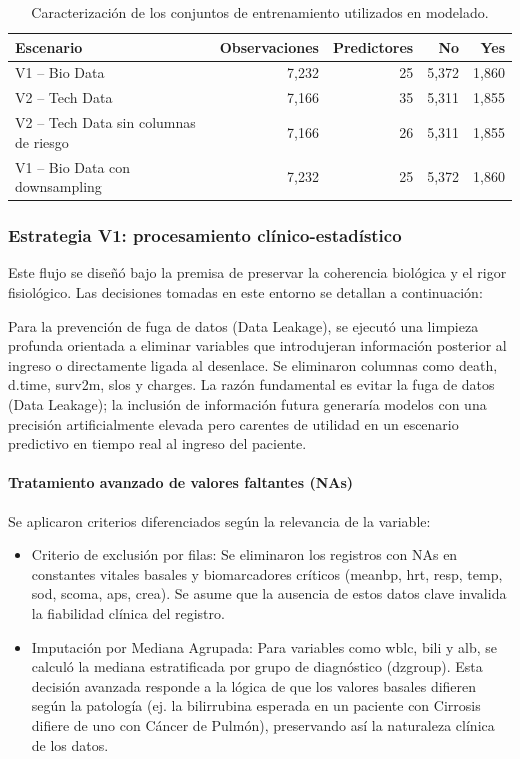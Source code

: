 \begin{table}[H]
  \centering
  \caption{Caracterización de los conjuntos de entrenamiento utilizados en modelado.}
  \label{tab:caracterizacion-modelado}
  \small
  \begin{tabular}{lrrrr}
    \toprule
    \textbf{Escenario} & \textbf{Observaciones} & \textbf{Predictores} & \textbf{No} & \textbf{Yes} \\
    \midrule
    V1 -- Bio Data & 7,232 & 25 & 5,372 & 1,860 \\
    V2 -- Tech Data & 7,166 & 35 & 5,311 & 1,855 \\
    V2 -- Tech Data sin columnas de riesgo & 7,166 & 26 & 5,311 & 1,855 \\
    V1 -- Bio Data con downsampling & 7,232 & 25 & 5,372 & 1,860 \\
    \bottomrule
  \end{tabular}
\end{table}

\subsubsection{Estrategia V1: procesamiento clínico-estadístico}

Este flujo se diseñó bajo la premisa de preservar la coherencia biológica y el
rigor fisiológico. Las decisiones tomadas en este entorno se detallan a
continuación:

Para la prevención de fuga de datos (Data Leakage), se ejecutó una limpieza profunda orientada a eliminar variables que introdujeran
información posterior al ingreso o directamente ligada al desenlace. Se
eliminaron columnas como death, d.time, surv2m, slos y charges. La razón fundamental es
evitar la fuga de datos (Data Leakage); la inclusión de información futura
generaría modelos con una precisión artificialmente elevada pero carentes de
utilidad en un escenario predictivo en tiempo real al ingreso del paciente.

\paragraph{Tratamiento avanzado de valores faltantes (NAs)}

Se aplicaron criterios diferenciados según la relevancia de la variable:

\begin{itemize}
  \item Criterio de exclusión por filas: Se eliminaron los registros con NAs en
    constantes vitales basales y biomarcadores críticos (meanbp, hrt, resp,
    temp, sod, scoma, aps, crea). Se asume que la ausencia de estos datos clave
    invalida la fiabilidad clínica del registro.
  \item Imputación por Mediana Agrupada: Para variables como wblc, bili y alb, se
    calculó la mediana estratificada por grupo de diagnóstico (dzgroup). Esta
    decisión avanzada responde a la lógica de que los valores basales difieren
    según la patología (ej. la bilirrubina esperada en un paciente con Cirrosis
    difiere de uno con Cáncer de Pulmón), preservando así la naturaleza clínica
    de los datos.
\end{itemize}


